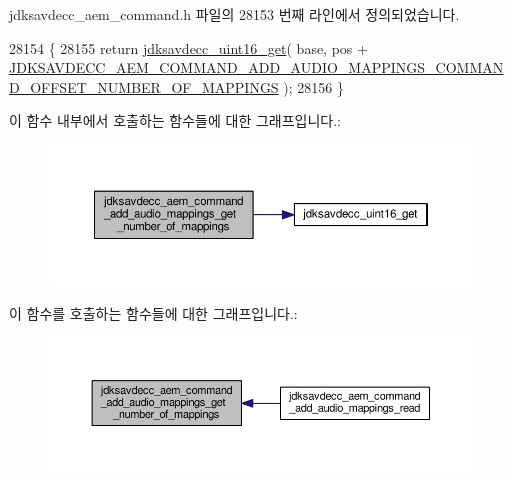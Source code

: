 jdksavdecc\+\_\+aem\+\_\+command.\+h 파일의 28153 번째 라인에서 정의되었습니다.


\begin{DoxyCode}
28154 \{
28155     \textcolor{keywordflow}{return} \hyperlink{group__endian_ga3fbbbc20be954aa61e039872965b0dc9}{jdksavdecc\_uint16\_get}( base, pos + 
      \hyperlink{group__command__add__audio__mappings_ga266d1d805e3c972db7e42f1e251f814a}{JDKSAVDECC\_AEM\_COMMAND\_ADD\_AUDIO\_MAPPINGS\_COMMAND\_OFFSET\_NUMBER\_OF\_MAPPINGS}
       );
28156 \}
\end{DoxyCode}


이 함수 내부에서 호출하는 함수들에 대한 그래프입니다.\+:
\nopagebreak
\begin{figure}[H]
\begin{center}
\leavevmode
\includegraphics[width=350pt]{group__command__add__audio__mappings_ga764619e184c30148008068d6768111f8_cgraph}
\end{center}
\end{figure}




이 함수를 호출하는 함수들에 대한 그래프입니다.\+:
\nopagebreak
\begin{figure}[H]
\begin{center}
\leavevmode
\includegraphics[width=350pt]{group__command__add__audio__mappings_ga764619e184c30148008068d6768111f8_icgraph}
\end{center}
\end{figure}


